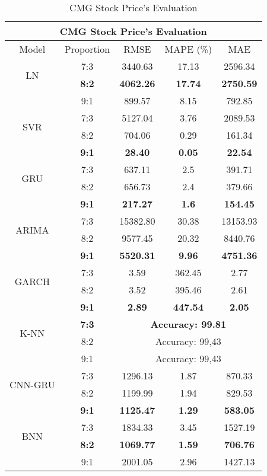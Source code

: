 \documentclass{ieeeojies}
\begin{document}
\begin{table}[H]
    \centering
    \begin{tabular}{|c|c|c|c|c|}
         \hline
         \multicolumn{5}{|c|}{\textbf{CMG Stock Price's Evaluation}}\\
         \hline
         \centering Model & Proportion & RMSE & MAPE (\%) & MAE\\
         \hline
         \multirow{2}{*}{LN} & 7:3 &3440.63 &17.13 &2596.34  \\ & \textbf{8:2}  & \textbf{4062.26} & \textbf{17.74} &\textbf{2750.59}  \\ & 9:1 &899.57 &8.15 &792.85 \\
         \hline
         \multirow{2}{*}{SVR} & 7:3 &5127.04  &3.76 &2089.53\\ & 8:2 & 704.06&0.29 &161.34 \\ & \textbf{9:1} &\textbf{28.40}  &\textbf{0.05}  &\textbf{22.54}\\
         \hline
         \multirow{2}{*}{GRU} & 7:3 	&637.11& 2.5 &  391.71\\ & 8:2 & 656.73 & 2.4 & 379.66 \\ & \textbf{9:1} & \textbf{217.27}  & \textbf{1.6} &\textbf{154.45}\\
         \hline
         \multirow{2}{*}{ARIMA} & 7:3 & 15382.80  & 30.38 & 13153.93 \\ & 8:2 &9577.45  & 20.32 & 8440.76 \\ &\textbf{9:1} & \textbf{5520.31}  &\textbf{ 9.96} &\textbf{4751.36}\\
         \hline
         \multirow{2}{*}{GARCH} & 7:3	&3.59 & 362.45&2.77\\ & 8:2 & 3.52 &395.46  & 2.61 \\ & \textbf{9:1} &\textbf{2.89}  &\textbf{447.54} &\textbf{2.05} \\
         \hline
         \multirow{2}{*}{K-NN} & \textbf{7:3} & \multicolumn{3}{c|}{\textbf{Accuracy: 99.81}}  \\ & 8:2 & \multicolumn{3}{c|}{Accuracy: 99,43}   \\ & 9:1 & \multicolumn{3}{c|}{Accuracy: 99,43}   \\
         \hline
         \multirow{2}{*}{CNN-GRU} & 7:3 & 1296.13 & 1.87 & 870.33 \\ & 8:2 & 1199.99 &1.94 &829.53  \\ & \textbf{9:1} &  \textbf{1125.47}	 & \textbf{1.29}& \textbf{583.05}	 \\
         \hline
         \multirow{2}{*}{BNN} & 7:3 & 1834.33  & 3.45 &1527.19 \\ & \textbf{8:2} &\textbf{1069.77}  & \textbf{1.59} & \textbf{706.76}\\ & 9:1& 2001.05 & 2.96  &1427.13 \\
         \hline
    \end{tabular}
    \caption{CMG Stock Price's Evaluation}
    \label{CMGresult}
\end{table}
\end{document}
